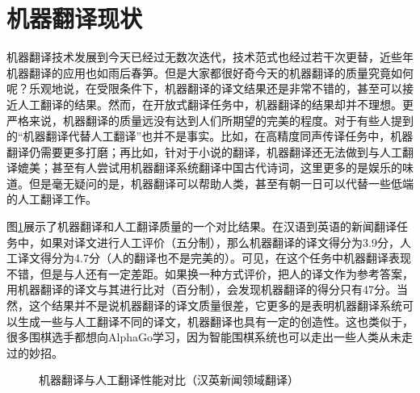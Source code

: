 \section{机器翻译现状}
\parinterval 机器翻译技术发展到今天已经过无数次迭代，技术范式也经过若干次更替，近些年机器翻译的应用也如雨后春笋。但是大家都很好奇今天的机器翻译的质量究竟如何呢？乐观地说，在受限条件下，机器翻译的译文结果还是非常不错的，甚至可以接近人工翻译的结果。然而，在开放式翻译任务中，机器翻译的结果却并不理想。更严格来说，机器翻译的质量远没有达到人们所期望的完美的程度。对于有些人提到的``机器翻译代替人工翻译''也并不是事实。比如，在高精度同声传译任务中，机器翻译仍需要更多打磨；再比如，针对于小说的翻译，机器翻译还无法做到与人工翻译媲美；甚至有人尝试用机器翻译系统翻译中国古代诗词，这里更多的是娱乐的味道。但是毫无疑问的是，机器翻译可以帮助人类，甚至有朝一日可以代替一些低端的人工翻译工作。

\parinterval 图\ref{fig:1-7}展示了机器翻译和人工翻译质量的一个对比结果。在汉语到英语的新闻翻译任务中，如果对译文进行人工评价（五分制），那么机器翻译的译文得分为3.9分，人工译文得分为4.7分（人的翻译也不是完美的）。可见，在这个任务中机器翻译表现不错，但是与人还有一定差距。如果换一种方式评价，把人的译文作为参考答案，用机器翻译的译文与其进行比对（百分制），会发现机器翻译的得分只有47分。当然，这个结果并不是说机器翻译的译文质量很差，它更多的是表明机器翻译系统可以生成一些与人工翻译不同的译文，机器翻译也具有一定的创造性。这也类似于，很多围棋选手都想向AlphaGo学习，因为智能围棋系统也可以走出一些人类从未走过的妙招。

\begin{figure}[htp]
   \centering

\setlength{\belowcaptionskip}{-0.5em}
    \caption{机器翻译与人工翻译性能对比（汉英新闻领域翻译）}
    \label{fig:1-7}
\end{figure}

